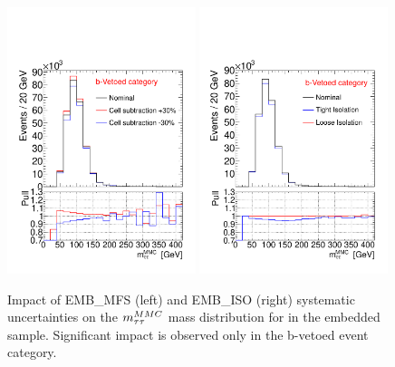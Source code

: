 \begin{figure}[tp]
	\begin{center}
	\includegraphics[width=0.49\textwidth]{figure/systematics/emb_sys_veto_MFS.pdf}
	\includegraphics[width=0.49\textwidth]{figure/systematics/emb_sys_veto_iso.pdf}
	\end{center}
	\caption{Impact of EMB\_MFS (left) and EMB\_ISO (right) systematic uncertainties on the $m_{\tau\tau}^{MMC}$ mass distribution for in the  embedded sample.
	Significant impact is observed only in the b-vetoed event category.}
	\label{fig:EMBMFS}
\end{figure}

%
%	
%


